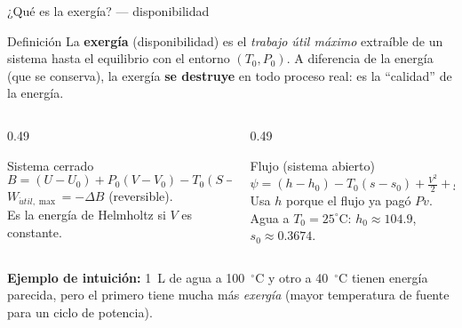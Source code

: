 \documentclass[aspectratio=169,10pt]{beamer}
\begin{document}
\begin{frame}{¿Qué es la exergía? --- disponibilidad}
\begin{cardidea}{Definición}{\faInfoCircle}
La \textbf{exergía} (disponibilidad) es el \emph{trabajo útil máximo} extraíble de un sistema hasta el equilibrio con el entorno $(T_0,P_0)$. A diferencia de la energía (que se conserva), la exergía \textbf{se destruye} en todo proceso real: es la ``calidad'' de la energía.
\end{cardidea}
\vspace{1.2mm}
\begin{columns}[T]
\begin{column}{0.49\textwidth}
\begin{cardgear}{Sistema cerrado}{\faSuperscript}
{\footnotesize
$$B=(U-U_0)+P_0(V-V_0)-T_0(S-S_0).$$
$W_{\acute util,\max}=-\Delta B$ (reversible).\\[0.5mm]
Es la energía de Helmholtz si $V$ es constante.}
\end{cardgear}
\end{column}
\begin{column}{0.49\textwidth}
\begin{cardgear}{Flujo (sistema abierto)}{\faSuperscript}
{\footnotesize
$$\psi=(h-h_0)-T_0(s-s_0)+\tfrac{V^2}{2}+gz.$$
Usa $h$ porque el flujo ya pagó $Pv$.\\[0.5mm]
Agua a $T_0{=}25^\circ$C: $h_0{\approx}104.9$, $s_0{\approx}0.3674$.}
\end{cardgear}
\end{column}
\end{columns}
\vspace{1.0mm}
\begin{cardnota}[\faInfoCircle]
\textbf{Ejemplo de intuición:} 1~L de agua a 100~$^\circ$C y otro a 40~$^\circ$C tienen energía parecida, pero el primero tiene mucha más \emph{exergía} (mayor temperatura de fuente para un ciclo de potencia).
\end{cardnota}
\end{frame}
\end{document}
